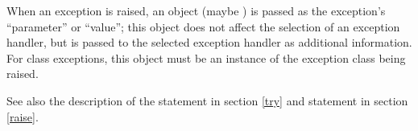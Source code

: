When an exception is raised, an object (maybe ) is passed
as the exception's ``parameter'' or ``value''; this object does not
affect the selection of an exception handler, but is passed to the
selected exception handler as additional information.  For class
exceptions, this object must be an instance of the exception class
being raised.

See also the description of the  statement in section
\ref{try} and  statement in section \ref{raise}.
